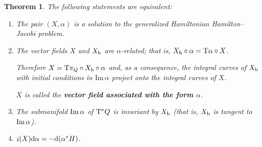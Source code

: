 \documentclass[12pt]{report}
\newtheorem{teor}{Theorem}[chapter]
\def\d{{\rm d}}
\def\Tan{{\rm T}}
\def\inn{\mathop{i}\nolimits}
\begin{document}
\begin{teor}
\label{HJhcns}
The following statements are equivalent:
\begin{enumerate}
\item
The pair $(X,\alpha)$ is a solution to the generalized Hamiltonian Hamilton--Jacobi problem.
\item 
The vector fields $X$ and $X_{\rm h}$ are $\alpha$-related; that is,
$X_{\rm h}\circ\alpha=\Tan\alpha\circ X$.

Therefore
$X=\Tan\pi_Q\circ X_{\rm h}\circ\alpha$ and, as a consequence,
the integral curves of $X_{\rm h}$ with initial conditions
in $\mathrm{Im}\,\alpha$ project onto the integral curves of 
$X$.

$X$ is called the \textbf{vector field associated with the form $\alpha$}.
\item
The submanifold ${\rm Im}\,\alpha$ of $\Tan^*Q$
is invariant by $X_{\rm h}$
(that is, $X_{\rm h}$ is tangent to ${\rm Im}\,\alpha$).
\item
$\inn(X)\d\alpha=-\d(\alpha^*H)$.
\end{enumerate}
\end{teor}
\end{document}
